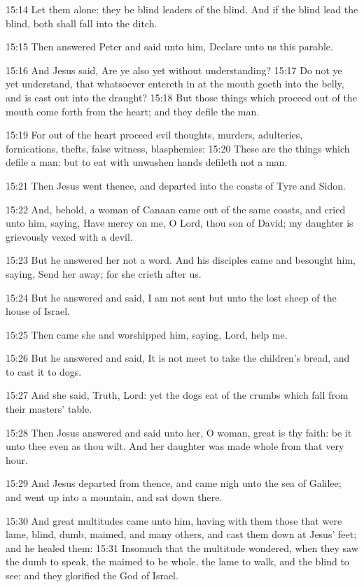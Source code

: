 15:14 Let them alone: they be blind leaders of the blind. And if the
blind lead the blind, both shall fall into the ditch.

15:15 Then answered Peter and said unto him, Declare unto us this
parable.

15:16 And Jesus said, Are ye also yet without understanding?  15:17 Do
not ye yet understand, that whatsoever entereth in at the mouth goeth
into the belly, and is cast out into the draught?  15:18 But those
things which proceed out of the mouth come forth from the heart; and
they defile the man.

15:19 For out of the heart proceed evil thoughts, murders, adulteries,
fornications, thefts, false witness, blasphemies: 15:20 These are the
things which defile a man: but to eat with unwashen hands defileth not
a man.

15:21 Then Jesus went thence, and departed into the coasts of Tyre and
Sidon.

15:22 And, behold, a woman of Canaan came out of the same coasts, and
cried unto him, saying, Have mercy on me, O Lord, thou son of David;
my daughter is grievously vexed with a devil.

15:23 But he answered her not a word. And his disciples came and
besought him, saying, Send her away; for she crieth after us.

15:24 But he answered and said, I am not sent but unto the lost sheep
of the house of Israel.

15:25 Then came she and worshipped him, saying, Lord, help me.

15:26 But he answered and said, It is not meet to take the children's
bread, and to cast it to dogs.

15:27 And she said, Truth, Lord: yet the dogs eat of the crumbs which
fall from their masters' table.

15:28 Then Jesus answered and said unto her, O woman, great is thy
faith: be it unto thee even as thou wilt. And her daughter was made
whole from that very hour.

15:29 And Jesus departed from thence, and came nigh unto the sea of
Galilee; and went up into a mountain, and sat down there.

15:30 And great multitudes came unto him, having with them those that
were lame, blind, dumb, maimed, and many others, and cast them down at
Jesus' feet; and he healed them: 15:31 Insomuch that the multitude
wondered, when they saw the dumb to speak, the maimed to be whole, the
lame to walk, and the blind to see: and they glorified the God of
Israel.

